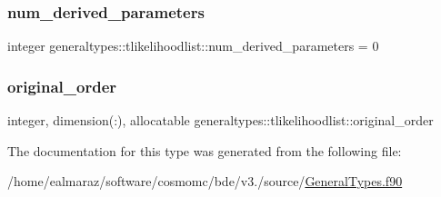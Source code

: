 \subsubsection{\texorpdfstring{num\+\_\+derived\+\_\+parameters}{num\_derived\_parameters}}
{\footnotesize\ttfamily integer generaltypes\+::tlikelihoodlist\+::num\+\_\+derived\+\_\+parameters = 0\hspace{0.3cm}{\ttfamily [private]}}

\mbox{\label{structgeneraltypes_1_1tlikelihoodlist_a9c5e94bf8eee21c3870c49b3ee51d9d9}} 
\subsubsection{\texorpdfstring{original\+\_\+order}{original\_order}}
{\footnotesize\ttfamily integer, dimension(\+:), allocatable generaltypes\+::tlikelihoodlist\+::original\+\_\+order\hspace{0.3cm}{\ttfamily [private]}}



The documentation for this type was generated from the following file\+:\begin{DoxyCompactItemize}
\item 
/home/ealmaraz/software/cosmomc/bde/v3./source/\mbox{\hyperlink{GeneralTypes_8f90}{General\+Types.\+f90}}\end{DoxyCompactItemize}
